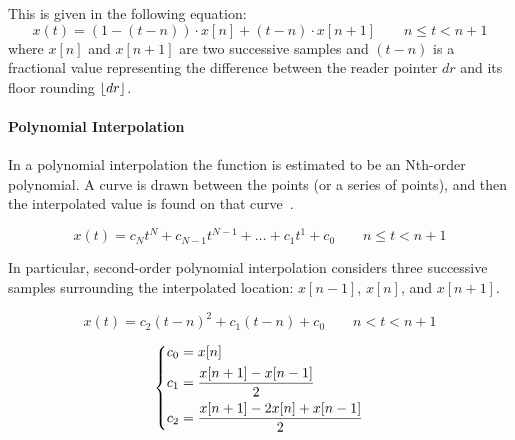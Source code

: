 This is given in the following equation:
\[
	x(t) = (1 - (t - n)) \cdot x[n] + (t-n) \cdot x[n+1] \qquad n \leq t < n + 1
\]
where $x[n]$ and $x[n+1]$ are two successive samples and $(t-n)$ is a fractional value representing the difference between the reader pointer $dr$ and its floor rounding $\lfloor dr\rfloor$.

\paragraph{Polynomial Interpolation}
In a polynomial interpolation the function is estimated to be an Nth-order polynomial. A curve is drawn between the points (or a series of points), and then the interpolated value is found on that curve~\cite{pirkle2013designing}.

\[
	x(t) = c_{N}t^{N} + c_{N-1}t^{N-1} + \dots + c_{1}t^{1} + c_{0} \qquad n \leq t< n + 1
\]

In particular, second-order polynomial interpolation considers three successive samples surrounding the interpolated location: $x[n-1]$, $x[n]$, and $x[n+1]$. 

\[
	x(t) = c_{2}(t-n)^{2} + c_{1}(t-n) + c_{0} \qquad n < t < n + 1
\]

\[
	\begin{dcases}
		c_{0} = x[n] \\
		c_{1} = \frac{x[n+1] - x[n-1]}{2} \\
		c_{2} = \frac{x[n+1] - 2 x[n] + x[n-1]}{2} 
	\end{dcases}
\]
